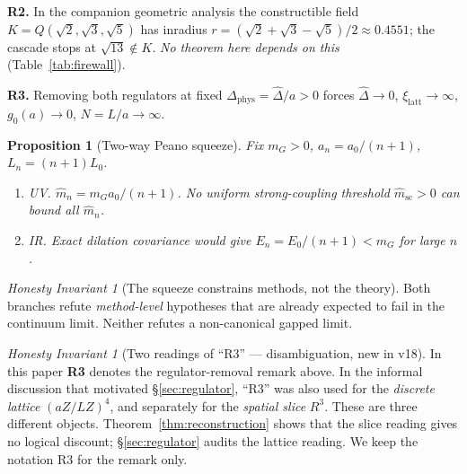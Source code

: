 \documentclass[11pt,a4paper]{article}
\def\R{R}\def\N{N}\def\Q{Q}\def\Z{Z}\def\Class{C}\def\OS{OS}\def\Gap{Gap}%
\theoremstyle{plain}
\newtheorem{proposition}[theorem]{Proposition}
\theoremstyle{definition}
\theoremstyle{remark}
\newtheorem{invariant}[theorem]{Honesty Invariant}
\newcommand{\R}{\mathbb{R}}\newcommand{\N}{\mathbb{N}}\newcommand{\Q}{\mathbb{Q}}
\newcommand{\Z}{\mathbb{Z}}\newcommand{\Spec}{\operatorname{Spec}}
\newcommand{\OS}{\mathrm{OS}}\newcommand{\Gap}{\mathrm{Gap}}
\newcommand{\Class}{\mathcal{C}}\newcommand{\Htot}{\mathcal{H}}
\renewcommand{\_}{\oldunderscore\allowbreak}
\begin{document}
\textbf{R2.} In the companion geometric analysis the constructible field
$K=\Q(\sqrt2,\sqrt3,\sqrt5)$ has inradius $r=(\sqrt2+\sqrt3-\sqrt5)/2\approx0.4551$; the cascade
stops at $\sqrt{13}\notin K$. \emph{No theorem here depends on this} (Table~\ref{tab:firewall}).

\textbf{R3.} Removing both regulators at fixed $\Delta_{\mathrm{phys}}=\hat\Delta/a>0$ forces
$\hat\Delta\to0$, $\xi_{\mathrm{latt}}\to\infty$, $g_0(a)\to0$, $N=L/a\to\infty$.
\begin{proposition}[Two-way Peano squeeze]\label{prop:squeeze}
Fix $m_G>0$, $a_n=a_0/(n+1)$, $L_n=(n+1)L_0$.
\begin{enumerate}[label=(\roman*),leftmargin=22pt,itemsep=1pt]
\item \emph{UV.} $\hat m_n=m_Ga_0/(n+1)$. No uniform strong-coupling threshold
$\hat m_{\mathrm{sc}}>0$ can bound all $\hat m_n$.
\item \emph{IR.} Exact dilation covariance would give $E_n=E_0/(n+1)<m_G$ for large $n$.
\end{enumerate}
\end{proposition}
\begin{invariant}[The squeeze constrains methods, not the theory]\label{inv:squeeze}
Both branches refute \emph{method-level} hypotheses that are already expected to fail in the
continuum limit. Neither refutes a non-canonical gapped limit.
\end{invariant}
\begin{invariant}[Two readings of ``R3'' --- disambiguation, new in v18]\label{inv:R3}
In this paper \textbf{R3} denotes the regulator-removal remark above. In the informal discussion
that motivated \S\ref{sec:regulator}, ``R3'' was also used for the \emph{discrete lattice}
$(a\Z/L\Z)^4$, and separately for the \emph{spatial slice} $\R^3$. These are three different
objects. Theorem~\ref{thm:reconstruction} shows that the slice reading gives no logical discount;
\S\ref{sec:regulator} audits the lattice reading. We keep the notation R3 for the remark only.
\end{invariant}
\end{document}
